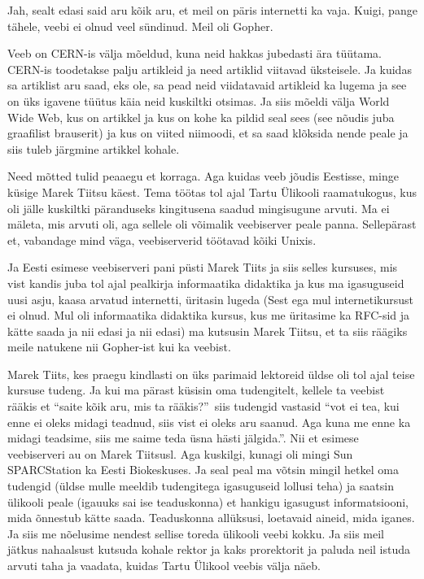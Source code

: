 
Jah, sealt edasi said aru kõik aru, et meil on päris internetti ka vaja. Kuigi, pange tähele, veebi ei olnud veel sündinud. Meil oli Gopher. 

Veeb on CERN-is välja mõeldud, kuna neid hakkas jubedasti ära tüütama.  CERN-is toodetakse palju artikleid ja need artiklid viitavad üksteisele. Ja kuidas sa artiklist aru saad, eks ole, sa pead neid viidatavaid artikleid ka lugema ja see on üks igavene tüütus käia neid kuskiltki otsimas. Ja siis mõeldi välja World Wide Web, kus on artikkel ja kus on kohe ka  pildid seal sees (see nõudis juba graafilist brauserit) ja kus on viited niimoodi, et sa saad klõksida nende peale ja siis tuleb järgmine artikkel kohale. 


Need mõtted tulid peaaegu et korraga. Aga kuidas veeb jõudis Eestisse, minge küsige Marek Tiitsu käest. Tema töötas tol ajal Tartu Ülikooli raamatukogus, kus oli jälle kuskiltki päranduseks kingitusena saadud mingisugune arvuti. Ma ei mäleta, mis arvuti oli, aga sellele oli  võimalik veebiserver peale panna. Sellepärast et, vabandage mind väga, veebiserverid töötavad kõiki Unixis. 

Ja Eesti esimese veebiserveri pani püsti Marek Tiits ja siis selles kursuses, mis vist kandis juba tol ajal pealkirja informaatika didaktika ja kus ma igasuguseid uusi asju, kaasa arvatud internetti, üritasin lugeda (Sest ega mul internetikursust ei olnud. Mul oli informaatika didaktika kursus, kus me üritasime ka RFC-sid ja kätte saada ja nii edasi ja nii edasi) ma kutsusin Marek Tiitsu, et ta siis räägiks meile natukene nii Gopher-ist kui ka veebist. 

Marek Tiits, kes praegu kindlasti on üks parimaid lektoreid üldse oli tol ajal teise kursuse tudeng. Ja kui ma pärast küsisin oma tudengitelt, kellele ta  veebist rääkis et \enquote{saite kõik aru, mis ta rääkis?} siis tudengid vastasid \enquote{vot ei tea, kui enne ei oleks midagi teadnud, siis vist ei oleks aru saanud. Aga kuna me enne ka midagi teadsime, siis me saime teda üsna hästi jälgida.}. Nii et esimese veebiserveri au on Marek Tiitsusl. Aga kuskilgi, kunagi oli mingi Sun SPARCStation  ka Eesti Biokeskuses. Ja seal peal ma võtsin mingil hetkel oma tudengid (üldse mulle meeldib tudengitega igasuguseid lollusi teha) ja  saatsin ülikooli peale (igauuks sai ise teaduskonna) et hankigu igasugust informatsiooni, mida õnnestub kätte saada. Teaduskonna allüksusi, loetavaid aineid, mida iganes. Ja siis me nõelusime nendest sellise toreda ülikooli veebi kokku. Ja siis meil jätkus nahaalsust kutsuda kohale rektor ja kaks prorektorit ja paluda neil istuda arvuti taha ja vaadata, kuidas Tartu Ülikool veebis välja näeb. 

